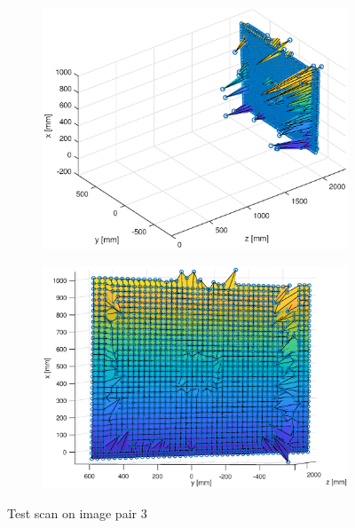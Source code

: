 \begin{figure}[h!]
\begin{subfigure}[t]{0.35\linewidth}
	\end{subfigure}
	\begin{subfigure}[t]{0.45\linewidth}
		\centering
		\includegraphics[width=1\linewidth]{figures/part2/test3_scan}
	\end{subfigure}
	\begin{subfigure}[t]{0.45\linewidth}
		\centering
		\includegraphics[width=1\linewidth]{figures/part2/test3_scan1}
	\end{subfigure}
	\caption{Test scan on image pair 3}
\end{figure}